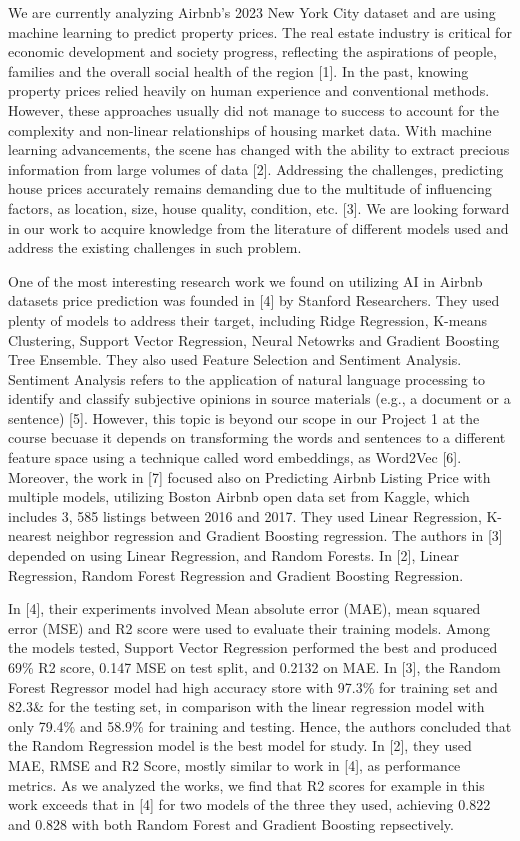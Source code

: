 \documentclass[a4paper,12pt]{article}
\begin{document}
We are currently analyzing Airbnb's 2023 New York City dataset and are using machine learning to predict property prices. The real estate industry is critical for economic development and society progress, reflecting the aspirations of people, families and the overall social health of the region [1]. In the past, knowing property prices relied heavily on human experience and conventional methods. However, these approaches usually did not manage to success to account for the complexity and non-linear relationships of housing market data. With machine learning advancements, the scene has changed with the ability to extract precious information from large volumes of data [2]. Addressing the challenges, predicting house prices accurately remains demanding due to the multitude of influencing factors, as location, size, house quality, condition, etc. [3]. We are looking forward in our work to acquire knowledge from the literature of different models used and address the existing challenges in such problem.

One of the most interesting research work we found on utilizing AI in Airbnb datasets price prediction was founded in [4] by Stanford Researchers. They used plenty of models to address their target, including Ridge Regression, K-means Clustering, Support Vector Regression, Neural Netowrks and Gradient Boosting Tree Ensemble. They also used Feature Selection and Sentiment Analysis. Sentiment Analysis refers to the application of natural language processing to identify and classify subjective opinions in source materials (e.g., a document or a sentence) [5]. However, this topic is beyond our scope in our Project 1 at the course becuase it depends on transforming the words and sentences to a different feature space using a technique called word embeddings, as Word2Vec [6]. Moreover, the work in [7] focused also on Predicting Airbnb Listing Price with multiple models, utilizing Boston Airbnb open data set from Kaggle, which includes 3, 585 listings between 2016 and 2017. They used Linear Regression, K-nearest neighbor regression and Gradient Boosting regression. The authors in [3] depended on using Linear Regression, and Random Forests. In [2], Linear Regression, Random Forest Regression and Gradient Boosting Regression.

In [4], their experiments involved Mean absolute error (MAE), mean squared error (MSE) and R2 score were used to evaluate their training models. Among the models tested, Support Vector Regression performed the best and produced 69\% R2 score, 0.147 MSE on test split, and 0.2132 on MAE. In [3], the Random Forest Regressor model had high accuracy store with 97.3\% for training set and 82.3\& for the testing set, in comparison with the linear regression model with only 79.4\% and 58.9\% for training and testing. Hence, the authors concluded that the Random Regression model is the best model for study. In [2], they used MAE, RMSE and R2 Score, mostly similar to work in [4], as performance metrics. As we analyzed the works, we find that R2 scores for example in this work exceeds that in [4] for two models of the three they used, achieving 0.822 and 0.828 with both Random Forest and Gradient Boosting repsectively.
\end{document}

